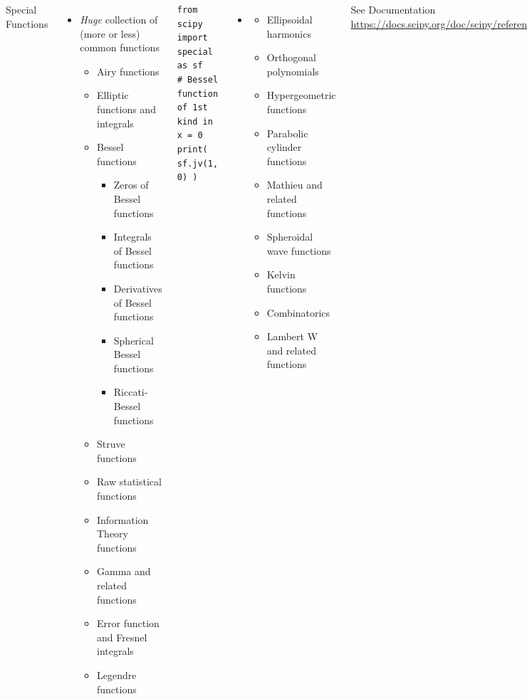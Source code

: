 \begin{frame}[fragile]
%
\begin{columns}[T]
\begin{Large}
	{Special Functions}
	\vspace{6pt}
\end{Large}
%
\begin{itemize}
\item \emph{Huge} collection of (more or less) common functions
	\begin{itemize}
	\item Airy functions
	\item Elliptic functions and integrals
	\item Bessel functions
		\begin{itemize}
		\item Zeros of Bessel functions
		\item Integrals of Bessel functions
		\item Derivatives of Bessel functions
		\item Spherical Bessel functions
		\item Riccati-Bessel functions
		\end{itemize}
	\item Struve functions
	\item Raw statistical functions
	\item Information Theory functions
	\item Gamma and related functions
	\item Error function and Fresnel integrals
	\item Legendre functions
	\end{itemize}
\end{itemize}
%
\begin{codebox}
\begin{verbatim}
from scipy import special as sf
# Bessel function of 1st kind in x = 0
print( sf.jv(1, 0) ) 
\end{verbatim}
\end{codebox}
%
\begin{itemize}
\item[]
\begin{itemize}
	\item Ellipsoidal harmonics
	\item Orthogonal polynomials
	\item Hypergeometric functions
	\item Parabolic cylinder functions
	\item Mathieu and related functions
	\item Spheroidal wave functions
	\item Kelvin functions
	\item Combinatorics
	\item Lambert W and related functions
\end{itemize}
\end{itemize}
%
See Documentation\\
	\scriptsize \url{https://docs.scipy.org/doc/scipy/reference/special.html}
\end{columns}
%
\end{frame}

